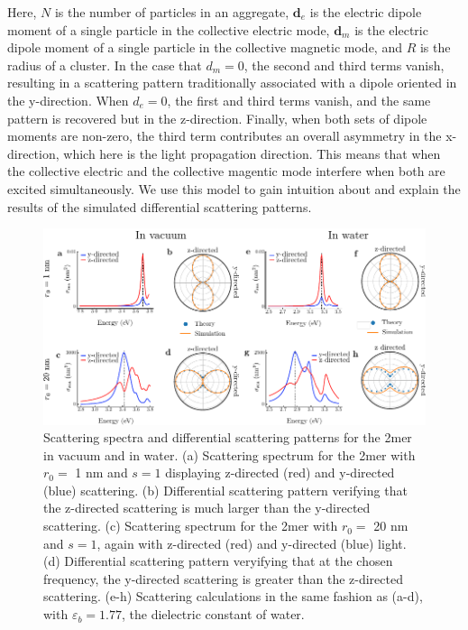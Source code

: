 \documentclass[journal=apchd5,manuscript=article]{achemso}
\begin{document}
\noindent Here, $N$ is the number of particles in an aggregate, $\textbf{d}_e$ is the electric dipole moment of a single particle in the collective electric mode, $\textbf{d}_m$ is the electric dipole moment of a single particle in the collective magnetic mode, and $R$ is the radius of a cluster. In the case that $d_m = 0$, the second and third terms vanish, resulting in a scattering pattern traditionally associated with a dipole oriented in the y-direction. When $d_e = 0$, the first and third terms vanish, and the same pattern is recovered but in the z-direction. Finally, when both sets of dipole moments are non-zero, the third term contributes an overall asymmetry in the x-direction, which here is the light propagation direction. This means that when the collective electric and the collective magentic mode interfere when both are excited simultaneously. We use this model to gain intuition about and explain the results of the simulated differential scattering patterns.

\begin{figure}
\includegraphics[width=5.5in]{yz_scat.pdf}
\caption{Scattering spectra and differential scattering patterns for the 2mer in vacuum and in water. (a) Scattering spectrum for the 2mer with $r_0 =$ 1 nm and $s = 1$ displaying z-directed (red) and y-directed (blue) scattering. (b) Differential scattering pattern verifying that the z-directed scattering is much larger than the y-directed scattering. (c) Scattering spectrum for the 2mer with $r_0 =$ 20 nm and $s=1$, again with z-directed (red) and y-directed (blue) light. (d) Differential scattering pattern veryifying that at the chosen frequency, the y-directed scattering is greater than the z-directed scattering. (e-h) Scattering calculations in the same fashion as (a-d), with $\varepsilon_b = 1.77$, the dielectric constant of water.}
\label{yz_scattering}
\end{figure}
\end{document}
